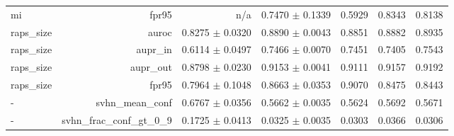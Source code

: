 \begin{table}
\begin{tabular}{lrrrrrr}
       mi &                 fpr95 &                                     n/a &                           0.7470 $\pm$ 0.1339 &     0.5929 &     0.8343 &     0.8138 \\
raps\_size &                 auroc &                         0.8275 $\pm$ 0.0320 &                           0.8890 $\pm$ 0.0043 &     0.8851 &     0.8882 &     0.8935 \\
raps\_size &               aupr\_in &                         0.6114 $\pm$ 0.0497 &                           0.7466 $\pm$ 0.0070 &     0.7451 &     0.7405 &     0.7543 \\
raps\_size &              aupr\_out &                         0.8798 $\pm$ 0.0230 &                           0.9153 $\pm$ 0.0041 &     0.9111 &     0.9157 &     0.9192 \\
raps\_size &                 fpr95 &                         0.7964 $\pm$ 0.1048 &                           0.8663 $\pm$ 0.0353 &     0.9070 &     0.8475 &     0.8443 \\
        - &        svhn\_mean\_conf &                         0.6767 $\pm$ 0.0356 &                           0.5662 $\pm$ 0.0035 &     0.5624 &     0.5692 &     0.5671 \\
        - & svhn\_frac\_conf\_gt\_0\_9 &                         0.1725 $\pm$ 0.0413 &                           0.0325 $\pm$ 0.0035 &     0.0303 &     0.0366 &     0.0306 \\
\bottomrule
\end{tabular}
\end{table}
